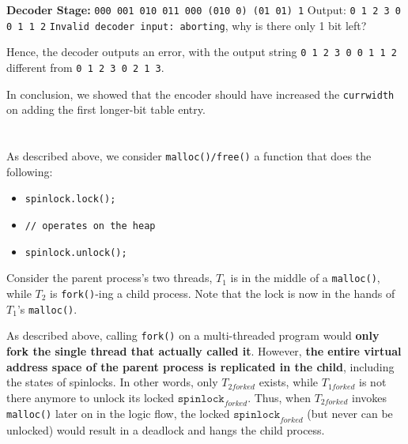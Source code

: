 \documentclass[12pt]{article}
\begin{document}
\textbf{Decoder Stage:} \texttt{000 001 010 011 000 (010 0) (01 01) {\color{red}1}}
\newline Output: \texttt{0 1 2 3 0 0 1 1 2}
\newline \texttt{Invalid decoder input: aborting}, why is there only 1 bit left?

Hence, the decoder outputs an error, with the output string \texttt{0 1 2 3 0 0 1 1 2} different from \texttt{0 1 2 3 0 2 1 3}.

In conclusion, we showed that the encoder should have increased the \texttt{currwidth} on adding the first longer-bit table entry.


\newpage
\section{}

\newpage
\section{}

\subsection{}

\subsubsection{}

As described above, we consider \texttt{malloc()/free()} a function that does the following:
\begin{itemize}[topsep=0pt]\itemsep-0.6em 
    \item \texttt{spinlock.lock();}
    \item \texttt{// operates on the heap}
    \item \texttt{spinlock.unlock();}
\end{itemize}

Consider the parent process's two threads, $T_1$ is in the middle of a \texttt{malloc()}, while $T_2$ is \texttt{fork()}-ing a child process. Note that the lock is now in the hands of $T_1$'s \texttt{malloc()}. 

As described above, calling \texttt{fork()} on a multi-threaded program would \textbf{only fork the single thread that actually called it}. However, \textbf{the entire virtual address space of the parent process is replicated in the child}, including the states of spinlocks. In other words, only $T_{2forked}$ exists, while $T_{1forked}$ is not there anymore to unlock its locked $\mathtt{spinlock}_{forked}$. Thus, when $T_{2forked}$ invokes \texttt{malloc()} later on in the logic flow, the locked $\mathtt{spinlock}_{forked}$ (but never can be unlocked) would result in a deadlock and hangs the child process.
\end{document}
